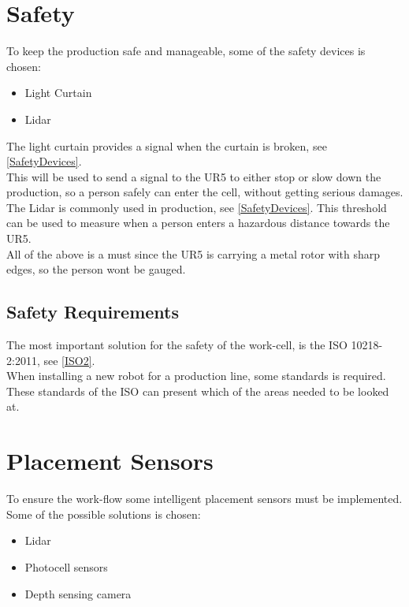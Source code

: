\section{Safety}

To keep the production safe and manageable, some of the safety devices is chosen:

\begin{itemize}
    \item Light Curtain
    \item Lidar
\end{itemize}

The light curtain provides a signal when the curtain is broken, see \ref{SafetyDevices}.\\
This will be used to send a signal to the UR5 to either stop or slow down the production, so a person safely can enter the cell, without getting serious damages.\\

The Lidar is commonly used in production, see \ref{SafetyDevices}.
This threshold can be used to measure when a person enters a hazardous distance towards the UR5.\\
All of the above is a must since the UR5 is carrying a metal rotor with sharp edges, so the person wont be gauged.\\

\subsection{Safety Requirements}

The most important solution for the safety of the work-cell, is the ISO 10218-2:2011, see \ref{ISO2}.\\
When installing a new robot for a production line, some standards is required. These standards of the ISO can present which of the areas needed to be looked at.\\

\section{Placement Sensors}

To ensure the work-flow some intelligent placement sensors must be implemented. Some of the possible solutions is chosen:\\

\begin{itemize}
    \item Lidar
    \item Photocell sensors
    \item Depth sensing camera
\end{itemize}

